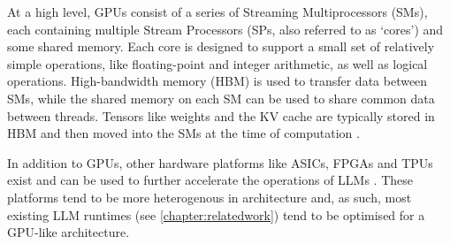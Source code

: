 \documentclass[11pt,twoside]{report}
\begin{document}
At a high level, GPUs consist of a series of Streaming Multiprocessors (SMs), each containing multiple Stream Processors (SPs, also referred to as `cores') and some shared memory\cite{choquette2021nvidia}. 
Each core is designed to support a small set of relatively simple operations, like floating-point and integer arithmetic, as well as logical operations.
High-bandwidth memory (HBM) is used to transfer data between SMs, while the shared memory on each SM can be used to share common data between threads.
Tensors like weights and the KV cache are typically stored in HBM and then moved into the SMs at the time of computation \cite{pope2023efficiently}.

In addition to GPUs, other hardware platforms like ASICs, FPGAs and TPUs exist and can be used to further accelerate the operations of LLMs \cite{li2024large}.
These platforms tend to be more heterogenous in architecture and, as such, most existing LLM runtimes (see \ref{chapter:relatedwork}) tend to be optimised for a GPU-like architecture.
\end{document}
